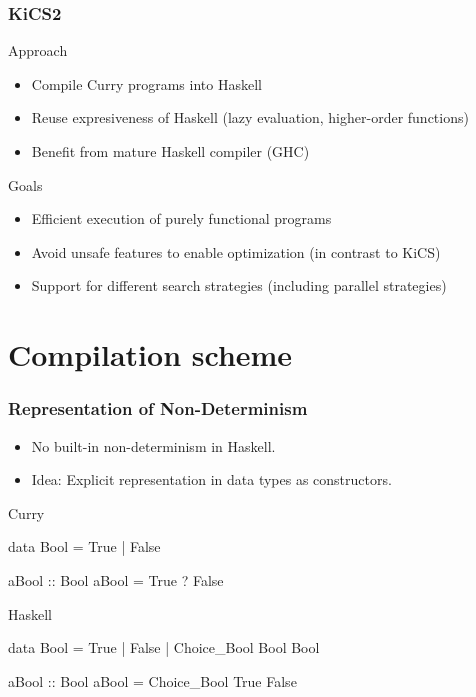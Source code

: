 \documentclass[utf8,handout]{beamer}
\begin{document}
\begin{frame}
\frametitle{KiCS2}
\begin{block}{Approach}
\begin{itemize}
\item Compile Curry programs into Haskell
\item Reuse expresiveness of Haskell (lazy evaluation, higher-order functions)
\item Benefit from mature Haskell compiler (GHC)
\end{itemize}
\end{block}

\begin{block}{Goals}
\begin{itemize}
\item Efficient execution of purely functional programs
\item Avoid unsafe features to enable optimization (in contrast to KiCS)
\item Support for different search strategies (including parallel strategies)
\end{itemize}
\end{block}
\end{frame}

\section{Compilation scheme}

\begin{frame}[fragile]
\frametitle{Representation of Non-Determinism}
\begin{itemize}
  \item No built-in non-determinism in Haskell.
  \item Idea: Explicit representation in data types as constructors.
\end{itemize}

\begin{block}{Curry}
\begin{semiverbatim}
data Bool = True | False

aBool :: Bool
aBool = True ? False
\end{semiverbatim}
\end{block}

\begin{block}{Haskell}
\begin{semiverbatim}
data Bool = True | False | Choice_Bool Bool Bool

aBool :: Bool
aBool = Choice_Bool True False
\end{semiverbatim}
\end{block}
\end{frame}
\end{document}
